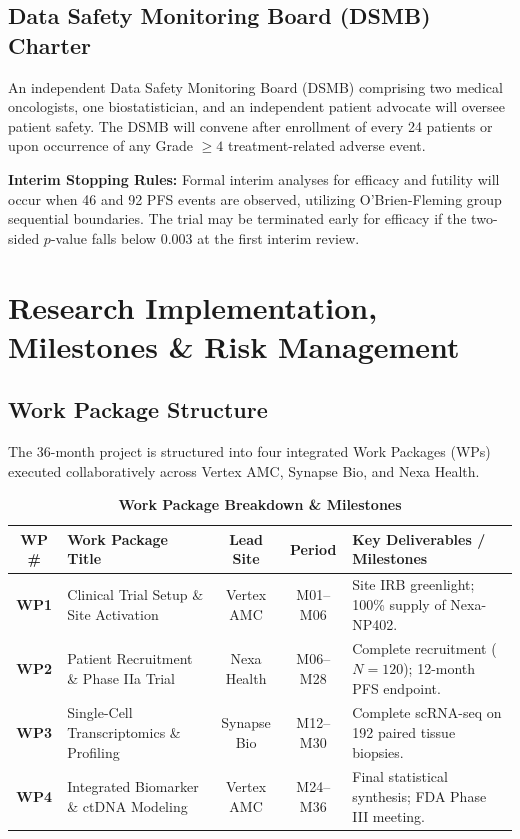 \documentclass[10pt,a4paper]{article}
\begin{document}
\subsection{Data Safety Monitoring Board (DSMB) Charter}
An independent Data Safety Monitoring Board (DSMB) comprising two medical oncologists, one biostatistician, and an independent patient advocate will oversee patient safety. The DSMB will convene after enrollment of every 24 patients or upon occurrence of any Grade $\ge 4$ treatment-related adverse event.

\textbf{Interim Stopping Rules:} Formal interim analyses for efficacy and futility will occur when 46 and 92 PFS events are observed, utilizing O'Brien-Fleming group sequential boundaries. The trial may be terminated early for efficacy if the two-sided $p$-value falls below $0.003$ at the first interim review.

\section{Research Implementation, Milestones \& Risk Management}

\subsection{Work Package Structure}
The 36-month project is structured into four integrated Work Packages (WPs) executed collaboratively across Vertex AMC, Synapse Bio, and Nexa Health.

\begin{table}[htbp]
\caption{\textbf{Work Package Breakdown \& Milestones}}
\vspace{-0.4em}
\small
\begin{tabularx}{\textwidth}{c X c c l}
\toprule
\rowcolor{HeaderBg} \textbf{WP \#} & \textbf{Work Package Title} & \textbf{Lead Site} & \textbf{Period} & \textbf{Key Deliverables / Milestones} \\
\midrule
\textbf{WP1} & Clinical Trial Setup \& Site Activation & Vertex AMC & M01--M06 & Site IRB greenlight; 100\% supply of Nexa-NP402. \\
\textbf{WP2} & Patient Recruitment \& Phase IIa Trial & Nexa Health & M06--M28 & Complete recruitment ($N=120$); 12-month PFS endpoint. \\
\textbf{WP3} & Single-Cell Transcriptomics \& Profiling & Synapse Bio & M12--M30 & Complete scRNA-seq on 192 paired tissue biopsies. \\
\textbf{WP4} & Integrated Biomarker \& ctDNA Modeling & Vertex AMC & M24--M36 & Final statistical synthesis; FDA Phase III meeting. \\
\bottomrule
\end{tabularx}
\end{table}
\end{document}
